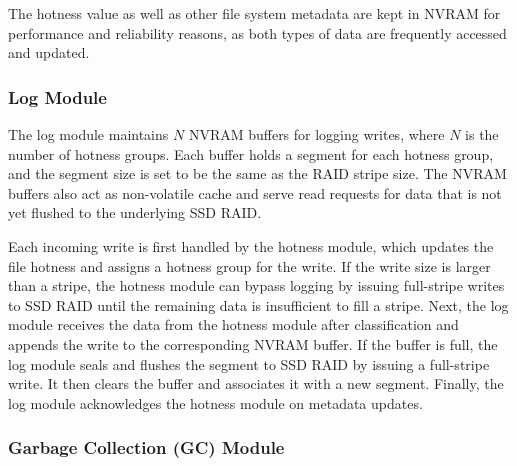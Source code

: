 The hotness value as well as other file system metadata are kept in NVRAM for
performance and reliability reasons, as both types of data are frequently
accessed and updated.  

\subsubsection{Log Module} 

The log module maintains $N$ NVRAM buffers for logging writes, where $N$ is
the number of hotness groups.  Each buffer holds a segment for each hotness
group, and the segment size is set to be the same as the RAID stripe size.
The NVRAM buffers also act as non-volatile cache and serve read requests for
data that is not yet flushed to the underlying SSD RAID.


Each incoming write is first handled by the hotness module, which updates the
file hotness and assigns a hotness group for the write. If the write size is
larger than a stripe, the hotness module can bypass logging by issuing
full-stripe writes to SSD RAID until the remaining data is insufficient to fill 
a stripe. Next, the log module receives the data from the hotness module after
classification and appends the write to the corresponding NVRAM buffer.  If
the buffer is full, the log module seals and flushes the segment to SSD RAID
by issuing a full-stripe write.  It then clears the buffer and associates it
with a new segment. Finally, the log module acknowledges the hotness module
on metadata updates.

\subsubsection{Garbage Collection (GC) Module}
\label{subsubsec:gcmod}



